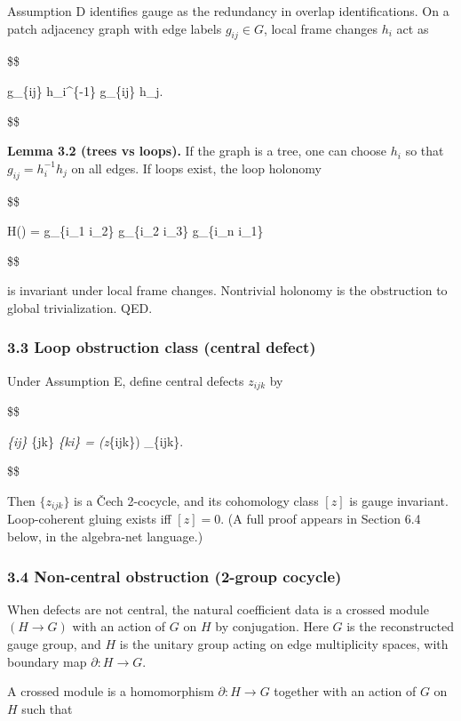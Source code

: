 \documentclass[11pt,a4paper]{article}
\theoremstyle{remark}
\begin{document}
Assumption D identifies gauge as the redundancy in overlap identifications.
On a patch adjacency graph with edge labels \(g_{ij} \in G\), local frame changes
\(h_i\) act as

\$\$

g\_\{ij\} \mapsto h\_i\^{}\{-1\} g\_\{ij\} h\_j.

\$\$

\textbf{Lemma 3.2 (trees vs loops).} If the graph is a tree, one can choose \(h_i\) so
that \(g_{ij} = h_i^{-1} h_j\) on all edges. If loops exist, the loop holonomy

\$\$

H(\gamma) = g\_\{i\_1 i\_2\} g\_\{i\_2 i\_3\} \cdots g\_\{i\_n i\_1\}

\$\$

is invariant under local frame changes. Nontrivial holonomy is the
obstruction to global trivialization. QED.

\subsubsection{3.3 Loop obstruction class (central defect)}\label{loop-obstruction-class-central-defect}

Under Assumption E, define central defects \(z_{ijk}\) by

\$\$

\varphi\emph{\{ij\} \varphi}\{jk\} \varphi\emph{\{ki\} = (z}\{ijk\}) \quad {} \_\{ijk\}.

\$\$

Then \(\{z_{ijk}\}\) is a Čech 2-cocycle, and its cohomology class \([z]\) is gauge
invariant. Loop-coherent gluing exists iff \([z] = 0\). (A full proof appears in
Section 6.4 below, in the algebra-net language.)

\subsubsection{3.4 Non-central obstruction (2-group cocycle)}\label{non-central-obstruction-2-group-cocycle}

When defects are not central, the natural coefficient data is a crossed module
\((H \to G)\) with an action of \(G\) on \(H\) by conjugation. Here \(G\) is the reconstructed
gauge group, and \(H\) is the unitary group acting on edge multiplicity spaces,
with boundary map \(\partial: H \to G\).

A crossed module is a homomorphism \(\partial: H \to G\) together with an action
of \(G\) on \(H\) such that
\end{document}
